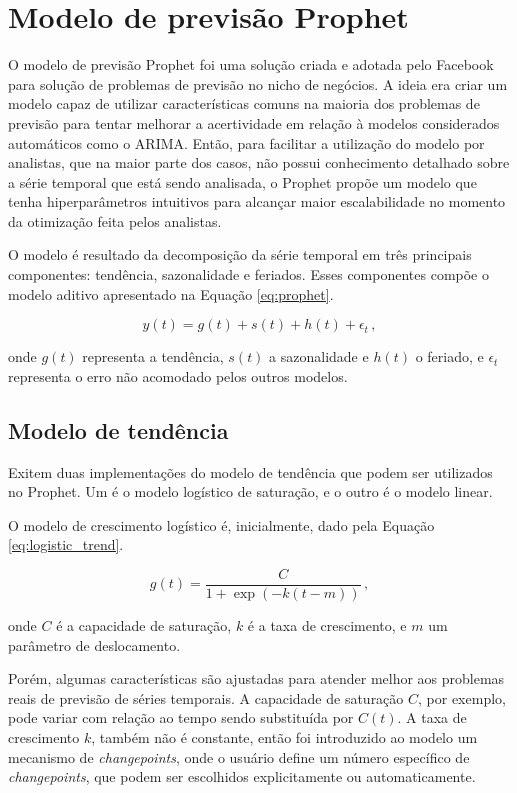 \section{Modelo de previsão Prophet}
O modelo de previsão Prophet \cite{fbprophet} foi uma solução criada e adotada pelo Facebook para solução de problemas de previsão no nicho de negócios. A ideia era criar um modelo capaz de utilizar características comuns na maioria dos problemas de previsão para tentar melhorar a acertividade em relação à modelos considerados automáticos como o ARIMA. Então, para facilitar a utilização do modelo por analistas, que na maior parte dos casos, não possui conhecimento detalhado sobre a série temporal que está sendo analisada, o Prophet propõe um modelo que tenha hiperparâmetros intuitivos para alcançar maior escalabilidade no momento da otimização feita pelos analistas.

O modelo é resultado da decomposição da série temporal em três principais componentes: tendência, sazonalidade e feriados. Esses componentes compõe o modelo aditivo apresentado na Equação \eqref{eq:prophet}.

\begin{equation}\label{eq:prophet}
    y(t) = g(t) + s(t) + h(t) + \epsilon_{t}\, ,
\end{equation}

onde $g(t)$ representa a tendência, $s(t)$ a sazonalidade e $h(t)$ o feriado, e $\epsilon_{t}$ representa o erro não acomodado pelos outros modelos.

\subsection{Modelo de tendência}
Exitem duas implementações do modelo de tendência que podem ser utilizados no Prophet. Um é o modelo logístico de saturação, e o outro é o modelo linear.

O modelo de crescimento logístico é, inicialmente, dado pela Equação \eqref{eq:logistic_trend}.

\begin{equation}\label{eq:logistic_trend}
    g(t)=\frac{C}{1+\exp (-k(t-m))}\, ,
\end{equation}

onde $C$ é a capacidade de saturação, $k$ é a taxa de crescimento, e $m$ um parâmetro de deslocamento.

Porém, algumas características são ajustadas para atender melhor aos problemas reais de previsão de séries temporais. A capacidade de saturação $C$, por exemplo, pode variar com relação ao tempo sendo substituída por $C(t)$. A taxa de crescimento $k$, também não é constante, então foi introduzido ao modelo um mecanismo de \textit{changepoints}, onde o usuário define um número específico de \textit{changepoints}, que podem ser escolhidos explicitamente ou automaticamente.

